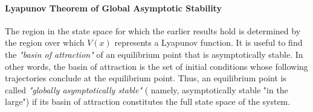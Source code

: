 \documentclass{thesisreport}
\begin{document}

\paragraph{Lyapunov Theorem of Global Asymptotic Stability}

The region in the state space for which the earlier results hold is determined by the region over which $V(x)$ represents a Lyapunov function. It is useful to find the \textit{"basin of attraction"} of an equilibrium point that is asymptotically stable. In other words, the basin of attraction is the set of initial conditions whose following trajectories conclude at the equilibrium point. Thus, an equilibrium point is called \textit{"globally asymptotically stable"} ( namely, asymptotically stable "in the large") if its basin of attraction constitutes the full state space of the system.\\
\end{document}
